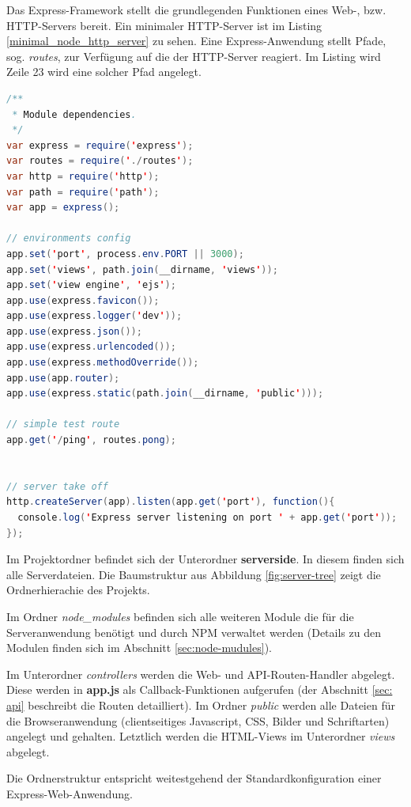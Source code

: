 Das Express-Framework stellt die grundlegenden Funktionen eines Web-, bzw. HTTP-Servers bereit.
Ein minimaler HTTP-Server ist im Listing \ref{minimal_node_http_server} zu sehen. 
Eine Express-Anwendung stellt Pfade, sog. \emph{routes}, zur Verfügung auf die der HTTP-Server reagiert. Im Listing wird Zeile 23 wird eine solcher Pfad angelegt. 

\begin{lstlisting}[label=minimal_node_http_server,language=Java, caption=Minimaler Node-HTTP-Server]
/**
 * Module dependencies.
 */
var express = require('express');
var routes = require('./routes');
var http = require('http');
var path = require('path');
var app = express();

// environments config
app.set('port', process.env.PORT || 3000);
app.set('views', path.join(__dirname, 'views'));
app.set('view engine', 'ejs');
app.use(express.favicon());
app.use(express.logger('dev'));
app.use(express.json());
app.use(express.urlencoded());
app.use(express.methodOverride());
app.use(app.router);
app.use(express.static(path.join(__dirname, 'public')));

// simple test route
app.get('/ping', routes.pong);


// server take off
http.createServer(app).listen(app.get('port'), function(){
  console.log('Express server listening on port ' + app.get('port'));
});
\end{lstlisting}

Im Projektordner befindet sich der Unterordner \textbf{serverside}. In diesem finden sich alle Serverdateien. 
Die Baumstruktur aus Abbildung \ref{fig:server-tree} zeigt die Ordnerhierachie des Projekts.

Im Ordner \textit{node\_modules} befinden sich alle weiteren Module die für die Serveranwendung benötigt und durch NPM verwaltet werden (Details zu den Modulen finden sich im Abschnitt \ref{sec:node-mudules}). 

Im Unterordner \textit{controllers} werden die Web- und API-Routen-Handler abgelegt. 
Diese werden in \textbf{app.js} als Callback-Funktionen aufgerufen (der Abschnitt \ref{sec: api} beschreibt die Routen detailliert). 
Im Ordner \textit{public} werden alle Dateien für die Browseranwendung (clientseitiges Javascript, CSS, Bilder und Schriftarten) angelegt und gehalten. 
Letztlich werden die HTML-Views im Unterordner \textit{views} abgelegt. 

Die Ordnerstruktur entspricht weitestgehend der Standardkonfiguration einer Express-Web-Anwendung.

